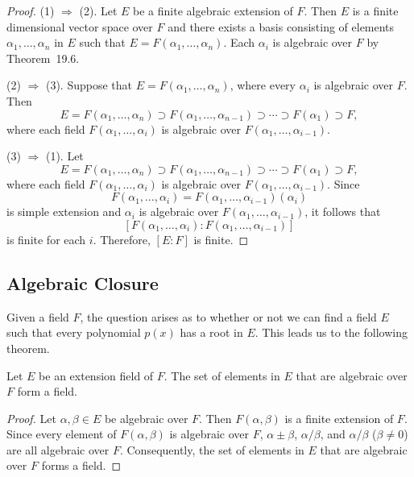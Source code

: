 \begin{proof}
(1) $\Rightarrow$ (2).
Let $E$ be a finite algebraic extension of $F$.  Then $E$ is a finite
dimensional vector space over $F$ and there exists a basis consisting 
of elements $\alpha_1, \ldots, \alpha_n$ in $E$ such that $E =
F(\alpha_1, \ldots, \alpha_n)$. Each $\alpha_i$ is algebraic over $F$
by Theorem~19.6. 


(2) $\Rightarrow$ (3).
Suppose that  $E = F(\alpha_1, \ldots, \alpha_n)$, where every
$\alpha_i$ is algebraic over $F$. Then 
\[
E = F(\alpha_1, \ldots, \alpha_n) \supset F(\alpha_1,
\ldots, \alpha_{n-1} ) \supset \cdots \supset
 F( \alpha_1 ) \supset F,
\]
where each field $F(\alpha_1, \ldots, \alpha_i)$ is algebraic over 
$F(\alpha_1, \ldots, \alpha_{i-1})$.
 

(3) $\Rightarrow$ (1). 
Let 
\[
E = F(\alpha_1, \ldots, \alpha_n) \supset F(\alpha_1,
\ldots, \alpha_{n-1} ) \supset \cdots \supset
 F( \alpha_1 ) \supset F,
\]
where each field $F(\alpha_1, \ldots, \alpha_i)$ is algebraic over 
$F(\alpha_1, \ldots, \alpha_{i-1})$. Since 
\[
F(\alpha_1, \ldots, \alpha_i) = 
F(\alpha_1, \ldots, \alpha_{i-1} )(\alpha_i)
\]
is simple extension and $\alpha_i$ is algebraic over $F(\alpha_1,
\ldots, \alpha_{i-1})$, it follows that
\[
[ F(\alpha_1, \ldots, \alpha_i) : F(\alpha_1, \ldots, \alpha_{i-1} )]
\]
is finite for each $i$. Therefore, $[E : F]$ is finite.
\end{proof}
 

 
\subsection*{Algebraic Closure}


Given a field $F$, the question arises as to whether or not we can
find a field $E$ such that every polynomial $p(x)$ has a root in $E$.
This leads us to the following theorem.

 
\begin{theorem}
Let $E$ be an extension field of $F$. The set of elements in $E$ that
are algebraic over $F$ form a field.
\end{theorem}
 
 
\begin{proof}
Let $\alpha, \beta \in E$ be algebraic over $F$. Then $F( \alpha,
\beta )$ is a finite extension of $F$.  Since every element of $F(
\alpha, \beta )$ is algebraic over $F$, $\alpha \pm \beta$, $\alpha /
\beta$, and $\alpha / \beta$ ($\beta \neq 0$) are all algebraic over
$F$. Consequently, the set of elements in $E$ that are algebraic over
$F$ forms a field.  
\end{proof}

